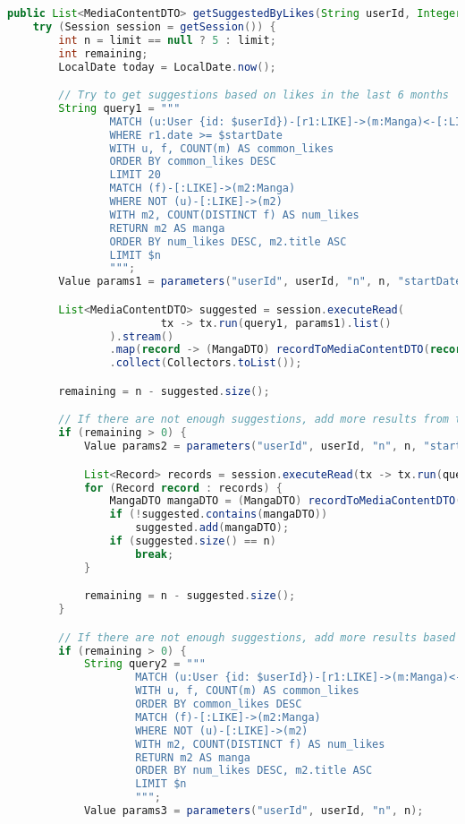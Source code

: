 \begin{mdframed}[style=customstyle]
\begin{lstlisting}[language=java]
public List<MediaContentDTO> getSuggestedByLikes(String userId, Integer limit) throws DAOException {
    try (Session session = getSession()) {
        int n = limit == null ? 5 : limit;
        int remaining;
        LocalDate today = LocalDate.now();

        // Try to get suggestions based on likes in the last 6 months
        String query1 = """
                MATCH (u:User {id: $userId})-[r1:LIKE]->(m:Manga)<-[:LIKE]-(f:User)
                WHERE r1.date >= $startDate
                WITH u, f, COUNT(m) AS common_likes
                ORDER BY common_likes DESC
                LIMIT 20
                MATCH (f)-[:LIKE]->(m2:Manga)
                WHERE NOT (u)-[:LIKE]->(m2)
                WITH m2, COUNT(DISTINCT f) AS num_likes
                RETURN m2 AS manga
                ORDER BY num_likes DESC, m2.title ASC
                LIMIT $n
                """;
        Value params1 = parameters("userId", userId, "n", n, "startDate", today.minusMonths(6));

        List<MediaContentDTO> suggested = session.executeRead(
                        tx -> tx.run(query1, params1).list()
                ).stream()
                .map(record -> (MangaDTO) recordToMediaContentDTO(record))
                .collect(Collectors.toList());

        remaining = n - suggested.size();

        // If there are not enough suggestions, add more results from the last 2 years
        if (remaining > 0) {
            Value params2 = parameters("userId", userId, "n", n, "startDate", today.minusYears(2));

            List<Record> records = session.executeRead(tx -> tx.run(query1, params2).list());
            for (Record record : records) {
                MangaDTO mangaDTO = (MangaDTO) recordToMediaContentDTO(record);
                if (!suggested.contains(mangaDTO))
                    suggested.add(mangaDTO);
                if (suggested.size() == n)
                    break;
            }

            remaining = n - suggested.size();
        }

        // If there are not enough suggestions, add more results based on all likes
        if (remaining > 0) {
            String query2 = """
                    MATCH (u:User {id: $userId})-[r1:LIKE]->(m:Manga)<-[:LIKE]-(f:User)
                    WITH u, f, COUNT(m) AS common_likes
                    ORDER BY common_likes DESC
                    MATCH (f)-[:LIKE]->(m2:Manga)
                    WHERE NOT (u)-[:LIKE]->(m2)
                    WITH m2, COUNT(DISTINCT f) AS num_likes
                    RETURN m2 AS manga
                    ORDER BY num_likes DESC, m2.title ASC
                    LIMIT $n
                    """;
            Value params3 = parameters("userId", userId, "n", n);


\end{lstlisting}
\end{mdframed}
